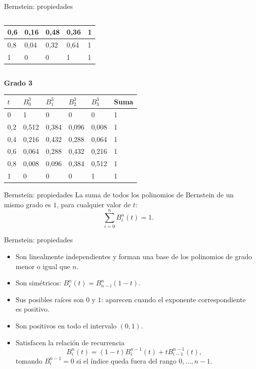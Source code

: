 \documentclass[original_version/main.tex]{subfiles}
\begin{document}
\begin{frame}[t]{Bernstein: propiedades}
\begin{columns}[T]
\begin{column}{.48\textwidth}
\begin{center}
\begin{tabular}{|C{.155\textwidth}|C{.155\textwidth}|C{.155\textwidth}|C{.155\textwidth}|C{.155\textwidth}|}
\rule[-1.5mm]{0pt}{3.7mm}0,6 & 0,16 & 0,48 & 0,36 & 1\\\hline
\rule[-1.5mm]{0pt}{3.7mm}0,8 & 0,04 & 0,32 & 0,64 & 1\\\hline
\rule[-1.5mm]{0pt}{3.7mm}1 & 0 & 0 & 1 & 1\\\hline
\end{tabular}\end{center}\endgroup\end{column}\end{columns}\textbf{Grado 3}\begingroup\scriptsize\setlength{\tabcolsep}{2pt}\begin{center}\begin{tabular}{|C{.14\textwidth}|C{.14\textwidth}|C{.14\textwidth}|C{.14\textwidth}|C{.14\textwidth}|C{.14\textwidth}|}\hline
$t$ & $B_0^3$ & $B_1^3$ & $B_2^3$ & $B_3^3$ & Suma\\\hline
\rule[-1.5mm]{0pt}{3.7mm}0 & 1 & 0 & 0 & 0 & 1\\\hline
\rule[-1.5mm]{0pt}{3.7mm}0,2 & 0,512 & 0,384 & 0,096 & 0,008 & 1\\\hline
\rule[-1.5mm]{0pt}{3.7mm}0,4 & 0,216 & 0,432 & 0,288 & 0,064 & 1\\\hline
\rule[-1.5mm]{0pt}{3.7mm}0,6 & 0,064 & 0,288 & 0,432 & 0,216 & 1\\\hline
\rule[-1.5mm]{0pt}{3.7mm}0,8 & 0,008 & 0,096 & 0,384 & 0,512 & 1\\\hline
\rule[-1.5mm]{0pt}{3.7mm}1 & 0 & 0 & 0 & 1 & 1\\\hline
\end{tabular}\end{center}\endgroup
\end{frame}

\begin{frame}[t]{Bernstein: propiedades}
La suma de todos los polinomios de Bernstein de un mismo grado es $1$, para cualquier valor de $t$:\[\sum_{i=0}^{n}B_i^n(t)=1.\]
\end{frame}

\begin{frame}[t]{Bernstein: propiedades}
\small\begin{itemize}
\item Son linealmente independientes y forman una base de los polinomios de grado menor o igual que $n$.
\item Son simétricos: $B_i^n(t)=B_{n-i}^n(1-t)$.
\item Sus posibles raíces son $0$ y $1$: aparecen cuando el exponente correspondiente es positivo.
\item Son positivos en todo el intervalo $(0,1)$.
\item Satisfacen la relación de recurrencia\[B_i^n(t)=(1-t)B_i^{n-1}(t)+tB_{i-1}^{n-1}(t),\]tomando $B_i^{n-1}=0$ si el índice queda fuera del rango $0,\ldots,n-1$.
\end{itemize}
\end{frame}
\end{document}
